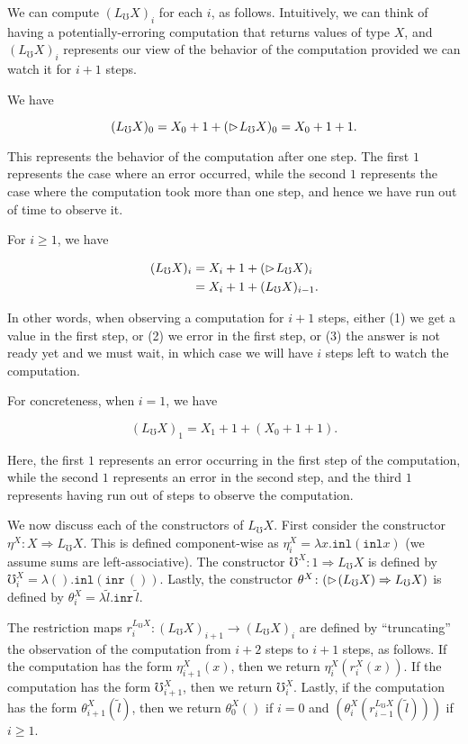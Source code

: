\documentclass{article}
\newcommand{\later}{\vartriangleright\hspace{-2px}}
\newcommand{\lift}{L_\mho}
\newcommand{\To}{\Rightarrow}
\newcommand{\inl}{\texttt{inl}}
\newcommand{\inr}{\texttt{inr}}
\begin{document}
We can compute $(\lift X)_i$ for each $i$, as follows. Intuitively, we can think of
having a potentially-erroring computation that returns values of type $X$,
and $(\lift X)_i$ represents our view of the behavior of the computation
provided we can watch it for $i+1$ steps.

We have

\[
    (\lift X)_0 = X_0 + 1 + (\later \lift X)_0 = X_0 + 1 + 1.
\]

This represents the behavior of the computation after one step.
The first $1$ represents the case where an error occurred, while
the second $1$ represents the case where the computation took more
than one step, and hence we have run out of time to observe it.

For $i \ge 1$, we have

\begin{align*}
    (\lift X)_i &= X_i + 1 + (\later \lift X)_i \\
                &= X_i + 1 + (\lift X)_{i-1}.
\end{align*}

In other words, when observing a computation for $i+1$ steps,
either (1) we get a value in the first step, or (2) we
error in the first step, or (3) the answer is not ready yet
and we must wait, in which case we will have $i$ steps left to watch
the computation.


For concreteness, when $i = 1$, we have

\[
    (\lift X)_1 = X_1 + 1 + (X_0 + 1 + 1).
\]

Here, the first $1$ represents an error occurring in the first step of the
computation, while the second $1$ represents an error in the second step,
and the third $1$ represents having run out of steps to observe the computation.


\vspace{4ex}

We now discuss each of the constructors of $\lift X$.
First consider the constructor $\eta^X \colon X \To \lift X$.
This is defined component-wise as $\eta^X_i = \lambda x . \inl (\inl x)$
(we assume sums are left-associative).
The constructor $\mho^X \colon 1 \To \lift X$ is defined by
$\mho^X_i = \lambda () . \inl (\inr \, ())$.
Lastly, the constructor $\theta^X \colon (\later (\lift X) \To \lift X)$
is defined by $\theta^X_i = \lambda \tilde{l} . \inr \, \tilde{l}$.

The restriction maps $r^{\lift X}_i \colon (\lift X)_{i+1} \to (\lift X)_i$
are defined by ``truncating'' the observation of the computation from $i+2$
steps to $i+1$ steps, as follows.
If the computation has the form $\eta^X_{i+1}(x)$, then we return $\eta^X_{i}(r^X_i(x))$.
If the computation has the form $\mho^X_{i+1}$, then we return $\mho^X_i$.
Lastly, if the computation has the form $\theta^X_{i+1} (\tilde{l})$, then
we return $\theta^X_0 ()$ if $i = 0$ and 
$(\theta^X_i (r^{\lift X}_{i-1} (\tilde{l})))$ if $i \ge 1$.
\end{document}
